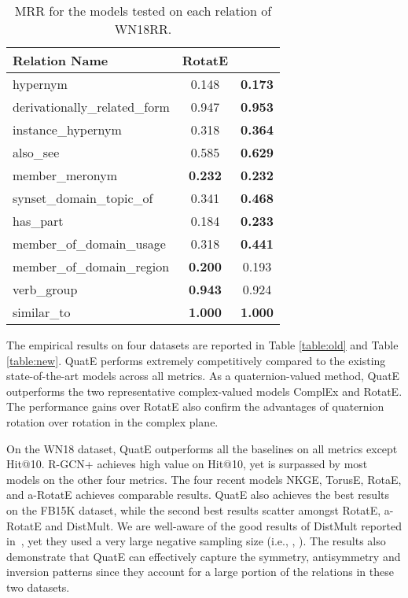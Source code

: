 \documentclass{article}
\begin{document}
\begin{wraptable}{r}{0.35\textwidth}
\vspace{-1em}
\tiny
\caption{MRR for the models tested on each relation of WN18RR.}
\begin{tabular}{|l|c|c|}
\hline
Relation Name                 & RotatE         &  \\ \hline
hypernym                      & 0.148          & \textbf{0.173} \\ \hline
derivationally\_related\_form & 0.947          & \textbf{0.953} \\ \hline
instance\_hypernym            & 0.318          & \textbf{0.364} \\ \hline
also\_see                     & 0.585          & \textbf{0.629} \\ \hline
member\_meronym               & \textbf{0.232} & \textbf{0.232} \\ \hline
synset\_domain\_topic\_of     & 0.341          & \textbf{0.468} \\ \hline
has\_part                     & 0.184          & \textbf{0.233} \\ \hline
member\_of\_domain\_usage     & 0.318          & \textbf{0.441} \\ \hline
member\_of\_domain\_region    & \textbf{0.200} & 0.193          \\ \hline
verb\_group                   & \textbf{0.943} & 0.924          \\ \hline
similar\_to                   & \textbf{1.000} & \textbf{1.000} \\ \hline
\end{tabular}
\label{each_rel}
\vspace{-1em}
\end{wraptable}
The empirical results on four datasets are reported in Table \ref{table:old} and Table \ref{table:new}. QuatE performs extremely competitively compared to the existing state-of-the-art models across all metrics. As a quaternion-valued method, QuatE outperforms the two representative complex-valued models ComplEx and RotatE. The performance gains over RotatE also confirm the advantages of quaternion rotation over rotation in the complex plane.


On the WN18 dataset, QuatE outperforms all the baselines on all metrics except Hit@10. R-GCN+ achieves high value on Hit@10, yet is surpassed by most models on the other four metrics. The four recent models NKGE, TorusE, RotaE, and a-RotatE achieves comparable results. QuatE also achieves the best results on the FB15K dataset, while the second best results scatter amongst RotatE, a-RotatE and DistMult. We are well-aware of the good results of DistMult reported in~\citep{kadlec2017knowledge}, yet they used a very large negative sampling size (i.e., , ). The results also demonstrate that QuatE can effectively capture the symmetry, antisymmetry and inversion patterns since they account for a large portion of the relations in these two datasets.
\end{document}
